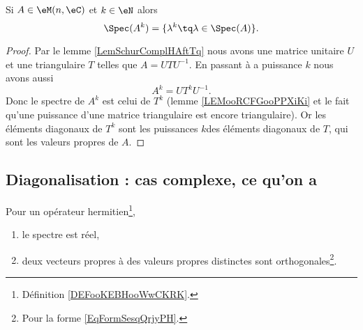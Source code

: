\begin{corollary}       \label{CORooTPDHooXazTuZ}
    Si \( A\in \eM(n,\eC)\) et \( k\in \eN\) alors
    \begin{equation}
        \Spec(A^k)=\{ \lambda^k\tq \lambda\in \Spec(A) \}.
    \end{equation}
\end{corollary}

\begin{proof}
    Par le lemme \ref{LemSchurComplHAftTq} nous avons une matrice unitaire \( U\) et une triangulaire \( T\) telles que \( A=UTU^{-1}\). En passant à a puissance \( k\) nous avons aussi
    \begin{equation}
        A^k=UT^kU^{-1}.
    \end{equation}
    Donc le spectre de \( A^k\) est celui de \( T^k\) (lemme \ref{LEMooRCFGooPPXiKi} et le fait qu'une puissance d'une matrice triangulaire est encore triangulaire). Or les éléments diagonaux de \( T^k\) sont les puissances \( k\)\ieme des éléments diagonaux de \( T\), qui sont les valeurs propres de \( A\).
\end{proof}

\subsection{Diagonalisation : cas complexe, ce qu'on a}

\begin{lemma}      \label{LEMooVCEOooIXnTpp}
    Pour un opérateur hermitien\footnote{Définition \ref{DEFooKEBHooWwCKRK}.},
    \begin{enumerate}
        \item
            le spectre est réel,
        \item
            deux vecteurs propres à des valeurs propres distinctes sont orthogonales\footnote{Pour la forme \eqref{EqFormSesqQrjyPH}.}.
    \end{enumerate}
\end{lemma}

